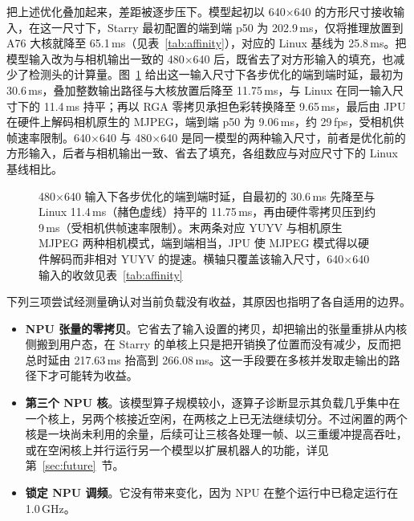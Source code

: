 \documentclass[11pt,a4paper]{ctexart}
\begin{document}
把上述优化叠加起来，差距被逐步压下。模型起初以 640$\times$640 的方形尺寸接收输入，在这一尺寸下，Starry 最初配置的端到端 p50 为 202.9\,ms，仅将推理放置到 A76 大核就降至 65.1\,ms（见表~\ref{tab:affinity}），对应的 Linux 基线为 25.8\,ms。把模型输入改为与相机输出一致的 480$\times$640 后，既省去了对方形输入的填充，也减少了检测头的计算量。图~\ref{fig:ladder} 给出这一输入尺寸下各步优化的端到端时延，最初为 30.6\,ms，叠加整数输出路径与大核放置后降至 11.75\,ms，与 Linux 在同一输入尺寸下的 11.4\,ms 持平；再以 RGA 零拷贝承担色彩转换降至 9.65\,ms，最后由 JPU 在硬件上解码相机原生的 MJPEG，端到端 p50 为 9.06\,ms，约 29\,fps，受相机供帧速率限制。640$\times$640 与 480$\times$640 是同一模型的两种输入尺寸，前者是优化前的方形输入，后者与相机输出一致、省去了填充，各组数应与对应尺寸下的 Linux 基线相比。

\begin{figure}[H]
\centering
{}
\caption{480$\times$640 输入下各步优化的端到端时延，自最初的 30.6\,ms 先降至与 Linux 11.4\,ms（赭色虚线）持平的 11.75\,ms，再由硬件零拷贝压到约 9\,ms（受相机供帧速率限制）。末两条对应 YUYV 与相机原生 MJPEG 两种相机模式，端到端相当，JPU 使 MJPEG 模式得以硬件解码而非相对 YUYV 的提速。横轴只覆盖该输入尺寸，640$\times$640 输入的收敛见表~\ref{tab:affinity}}\label{fig:ladder}
\end{figure}

下列三项尝试经测量确认对当前负载没有收益，其原因也指明了各自适用的边界。
\begin{itemize}
\item \textbf{NPU 张量的零拷贝}。它省去了输入设置的拷贝，却把输出的张量重排从内核侧搬到用户态，在 Starry 的单核上只是把开销换了位置而没有减少，反而把总时延由 217.63\,ms 抬高到 266.08\,ms。这一手段要在多核并发取走输出的路径下才可能转为收益。
\item \textbf{第三个 NPU 核}。该模型算子规模较小，逐算子诊断显示其负载几乎集中在一个核上，另两个核接近空闲，在两核之上已无法继续切分。不过闲置的两个核是一块尚未利用的余量，后续可让三核各处理一帧、以三重缓冲提高吞吐，或在空闲核上并行运行另一个模型以扩展机器人的功能，详见第~\ref{sec:future}~节。
\item \textbf{锁定 NPU 调频}。它没有带来变化，因为 NPU 在整个运行中已稳定运行在 1.0\,GHz。
\end{itemize}
\end{document}
